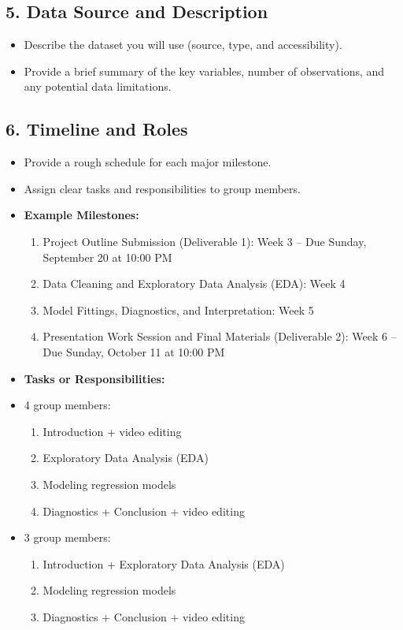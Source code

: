 \documentclass[12pt]{article}
\begin{document}
\subsection*{5. Data Source and Description}
\begin{itemize}
    \item Describe the dataset you will use (source, type, and accessibility).
    \item Provide a brief summary of the key variables, number of observations, and any potential data limitations.
\end{itemize}

\subsection*{6. Timeline and Roles}
\begin{itemize}
    \item Provide a rough schedule for each major milestone.
    \item Assign clear tasks and responsibilities to group members.
    \item \textbf{Example Milestones:}
    \begin{enumerate}
        \item Project Outline Submission (Deliverable 1): Week 3 -- Due Sunday, September 20 at 10:00 PM
        \item Data Cleaning and Exploratory Data Analysis (EDA): Week 4
        \item Model Fittings, Diagnostics, and Interpretation: Week 5
        \item Presentation Work Session and Final Materials (Deliverable 2): Week 6 -- Due Sunday, October 11 at 10:00 PM
    \end{enumerate}
    \item \textbf{Tasks or Responsibilities:}
    \item 4 group members:
    \begin{enumerate}
        \item Introduction + video editing
        \item Exploratory Data Analysis (EDA)
        \item Modeling regression models
        \item Diagnostics + Conclusion + video editing
    \end{enumerate}
    \item 3 group members:
    \begin{enumerate}
        \item Introduction + Exploratory Data Analysis (EDA)
        \item Modeling regression models
        \item Diagnostics + Conclusion + video editing
    \end{enumerate}
\end{itemize}
\end{document}
